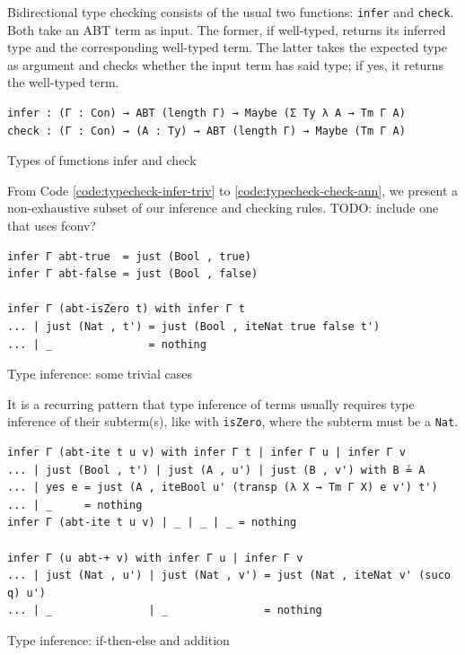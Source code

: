 Bidirectional type checking consists of the usual \cite{dunfield2021bidirectional} two functions: \verb$infer$ and \verb$check$. Both take an ABT term as input. The former, if well-typed, returns its inferred type and the corresponding well-typed term. The latter takes the expected type as argument and checks whether the input term has said type; if yes, it returns the well-typed term.

\begin{listing}[H]
\begin{verbatim}
infer : (Γ : Con) → ABT (length Γ) → Maybe (Σ Ty λ A → Tm Γ A)
check : (Γ : Con) → (A : Ty) → ABT (length Γ) → Maybe (Tm Γ A)
\end{verbatim}
\caption{Types of functions infer and check}
\label{code:typecheck-signatures}
\end{listing}

From Code \ref{code:typecheck-infer-triv} to \ref{code:typecheck-check-ann}, we present a non-exhaustive subset of our inference and checking rules. TODO: include one that uses fconv?

\begin{listing}[H]
\begin{verbatim}
infer Γ abt-true  = just (Bool , true)
infer Γ abt-false = just (Bool , false)

infer Γ (abt-isZero t) with infer Γ t
... | just (Nat , t') = just (Bool , iteNat true false t')
... | _               = nothing
\end{verbatim}
\caption{Type inference: some trivial cases}
\label{code:typecheck-infer-triv}
\end{listing}

It is a recurring pattern that type inference of terms usually requires type inference of their subterm(s), like with \verb$isZero$, where the subterm must be a \verb$Nat$.

\begin{listing}[H]
\begin{verbatim}
infer Γ (abt-ite t u v) with infer Γ t | infer Γ u | infer Γ v
... | just (Bool , t') | just (A , u') | just (B , v') with B ≟ A
... | yes e = just (A , iteBool u' (transp (λ X → Tm Γ X) e v') t')
... | _     = nothing
infer Γ (abt-ite t u v) | _ | _ | _ = nothing

infer Γ (u abt-+ v) with infer Γ u | infer Γ v
... | just (Nat , u') | just (Nat , v') = just (Nat , iteNat v' (suco q) u')
... | _               | _               = nothing
\end{verbatim}
\caption{Type inference: if-then-else and addition}
\label{code:typecheck-infer-ite}
\end{listing}

